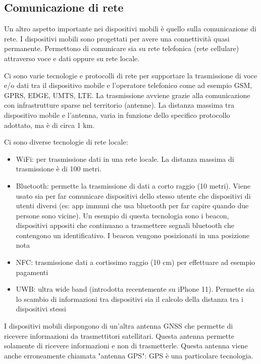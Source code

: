\subsection{Comunicazione di rete}
Un altro aspetto importante nei dispositivi mobili è quello sulla comunicazione di rete. 
I dispositivi mobili sono progettati per avere una connettività quasi permanente. 
Permettono di comunicare sia su rete telefonica (rete cellulare) attraverso voce e dati oppure su rete locale.

Ci sono varie tecnologie e protocolli di rete per supportare la trasmissione di voce e/o dati tra il dispositivo mobile e l’operatore telefonico come ad esempio GSM, GPRS, EDGE, UMTS, LTE.
La trasmissione avviene grazie alla comunicazione con infrastrutture sparse nel territorio (antenne). La distanza massima tra dispositivo mobile e l'antenna, varia in funzione dello specifico protocollo adottato, ma è di circa 1 km.

Ci sono diverse tecnologie di rete locale:
\begin{itemize}
    \item WiFi: per trasmissione dati in una rete locale. La distanza massima di trasmissione è di 100 metri.
    \item Bluetooth: permette la trasmissione di dati a corto raggio (10 metri). Viene usato sia per far comunicare dispositivi dello stesso utente che dispositivi di utenti diversi (es: app immuni che usa bluetooth per far capire quando due persone sono vicine).
    Un esempio di questa tecnologia sono i beacon, dispositivi appositi che continuano a trasmettere segnali bluetooth che contengono un identificativo. I beacon vengono posizionati in una posizione nota
    \item NFC: trasmissione dati a cortissimo raggio (10 cm) per effettuare ad esempio pagamenti
    \item UWB: ultra wide band (introdotta recentemente su iPhone 11). Permette sia lo scambio di informazioni tra dispositivi sia il calcolo della distanza tra i dispositivi stessi
\end{itemize}

I dispositivi mobili dispongono di un'altra antenna GNSS che permette di ricevere informazioni da trasmettitori satellitari. Questa antenna permette solamente di ricevere informazioni e non di trasmetterle.
Questa antenna viene anche erroneamente chiamata "antenna GPS": GPS è una particolare tecnologia.

